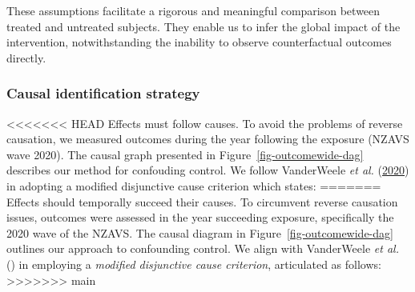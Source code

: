 \documentclass[
  singlecolumn,
  9pt]{article}
\begin{document}
These assumptions facilitate a rigorous and meaningful comparison
between treated and untreated subjects. They enable us to infer the
global impact of the intervention, notwithstanding the inability to
observe counterfactual outcomes directly.

\subsubsection{Causal identification
strategy}\label{causal-identification-strategy}

<<<<<<< HEAD
Effects must follow causes. To avoid the problems of reverse causation,
we measured outcomes during the year following the exposure (NZAVS wave
2020). The causal graph presented in Figure~\ref{fig-outcomewide-dag}
describes our method for confouding control. We follow VanderWeele
\emph{et al.} (\hyperref[ref-vanderweele2020]{2020}) in adopting a
modified disjunctive cause criterion which states:
=======
Effects should temporally succeed their causes. To circumvent reverse
causation issues, outcomes were assessed in the year succeeding
exposure, specifically the 2020 wave of the NZAVS. The causal diagram in
Figure~\ref{fig-outcomewide-dag} outlines our approach to confounding
control. We align with VanderWeele \emph{et al.}
() in employing a \emph{modified
disjunctive cause criterion}, articulated as follows:
>>>>>>> main
\end{document}
